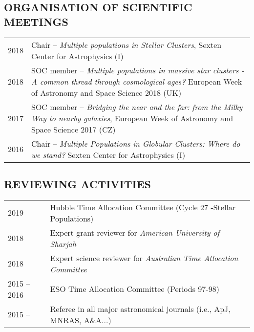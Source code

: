 \documentclass[ 11pt]{article}
\begin{document}
\subsection*{ORGANISATION OF SCIENTIFIC MEETINGS}
\begin{tabular}{p{2cm}p{14cm}}
2018  & Chair --  {\em Multiple populations in Stellar Clusters}, Sexten Center for Astrophysics (I) \\
 2018 & SOC member -- {\em Multiple populations in massive star clusters - A common thread through
cosmological ages?} European Week of Astronomy and Space Science 2018 (UK)\\
 2017 & SOC member -- {\em Bridging the near and the far: from the Milky Way to nearby galaxies}, European Week of Astronomy and Space Science 2017 (CZ)\\
 2016 &Chair -- {\em Multiple Populations in Globular Clusters: Where do we stand?} Sexten Center for Astrophysics (I) \\
\end{tabular}

\subsection*{REVIEWING ACTIVITIES}
\begin{tabular}{p{2cm}p{14cm}}
 2019  & Hubble Time Allocation Committee (Cycle 27 -Stellar Populations)\\
 2018 & Expert grant reviewer for {\em American University of Sharjah}\\
 2018  & Expert  science reviewer for {\em Australian Time Allocation Committee}\\
 2015 -- 2016 & ESO Time Allocation Committee (Periods 97-98)\\
 2015 --   & Referee in all major astronomical journals (i.e., ApJ, MNRAS, A\&A...)
 \end{tabular}
\end{document}
